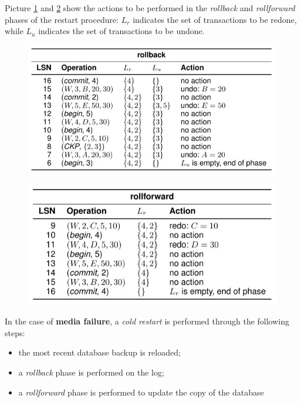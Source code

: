 Picture \ref{tr9} and \ref{tr10} show the actions to be performed in the \textit{rollback} and \textit{rollforward} phases of the restart procedure: $L_r$ indicates the set of transactions to be redone, while $L_u$ indicates the set of transactions to be undone.

\begin{figure}[h!]
		\centering
		\includegraphics[scale = 1.3]{img/tr9.jpg}
		\label{tr9}
\end{figure}

\begin{figure}[h!]
		\centering
		\includegraphics[scale = 1.3]{img/tr10.jpg}
		\label{tr10}
\end{figure}

In the case of \textbf{media failure}, a \textit{cold restart} is performed through the following steps:

\begin{itemize}
    \item the most recent database backup is reloaded;
    \item a \textit{rollback} phase is performed on the log;
    \item a \textit{rollforward} phase is performed to update the copy of the database
\end{itemize}

